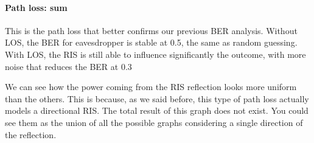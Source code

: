 \paragraph*{Path loss: sum}
This is the path loss that better confirms our previous BER analysis. Without LOS, the BER for eavesdropper is stable at 0.5, the same as random guessing. With LOS, the RIS is still able to influence significantly the outcome, with more noise that reduces the BER at 0.3

We can see how the power coming from the RIS reflection looks more uniform than the others. This is because, as we said before, this type of path loss actually models a directional RIS. The total result of this graph does not exist. You could see them as the union of all the possible graphs considering a single direction of the reflection.

